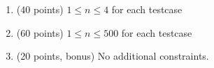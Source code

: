 \begin{enumerate}
    \tightlist
    \item (40 points) $1 \leq n \leq 4$ for each testcase
    \item (60 points) $1 \leq n \leq 500$ for each testcase
    \item (20 points, bonus) No additional constraints.
\end{enumerate}
    